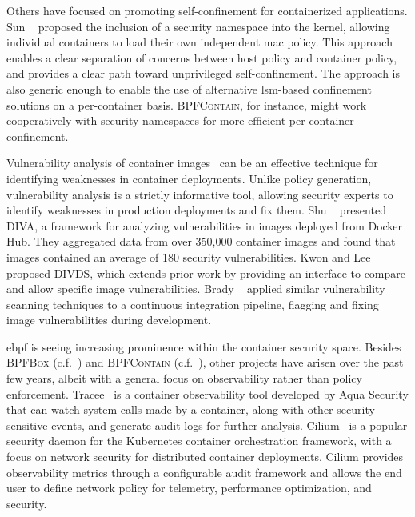 \documentclass[
  fontsize=12pt,
  titlepage=firstiscover,
  paper=letter,
oneside,
  cleardoublepage=plain,
  parskip=half-,
  DIV=10,
  parindent,
  appendixprefix,
  chapterprefix,
  listof=totoc,
]{scrbook}
\newcommand{\bpfbox}{\textsc{BPFBox}}
\newcommand{\bpfcontain}{\textsc{BPFContain}}
\begin{document}
Others have focused on promoting self-confinement for containerized applications. Sun
\etal~\cite{sun2018_security_namespace} proposed the inclusion of a security namespace
into the kernel, allowing individual containers to load their own independent \gls{mac}
policy. This approach enables a clear separation of concerns between host policy and
container policy, and provides a clear path toward unprivileged self-confinement. The
approach is also generic enough to enable the use of alternative \gls{lsm}-based
confinement solutions on a per-container basis. \bpfcontain{}, for instance, might work
cooperatively with security namespaces for more efficient per-container confinement.

Vulnerability analysis of container images~\cite{shu2017_image_vuln, kwon2020_divds,
brady2020_docker_cloud} can be an effective technique for identifying weaknesses in
container deployments. Unlike policy generation, vulnerability analysis is a strictly
informative tool, allowing security experts to identify weaknesses in production
deployments and fix them. Shu \etal~\cite{shu2017_image_vuln} presented DIVA, a framework
for analyzing vulnerabilities in images deployed from Docker Hub. They aggregated data
from over 350,000 container images and found that images contained an average of 180
security vulnerabilities. Kwon and Lee~\cite{kwon2020_divds} proposed DIVDS, which
extends prior work by providing an interface to compare and allow specific image
vulnerabilities.  Brady \etal~\cite{brady2020_docker_cloud} applied similar vulnerability
scanning techniques to a continuous integration pipeline, flagging and fixing image
vulnerabilities during development.

\gls{ebpf} is seeing increasing prominence within the container security space. Besides
\bpfbox{} (c.f.\ ) and \bpfcontain{} (c.f.\ ), other
projects have arisen over the past few years, albeit with a general focus on observability
rather than policy enforcement. Tracee~\cite{tracee} is a container observability tool
developed by Aqua Security that can watch system calls made by a container, along with
other security-sensitive events, and generate audit logs for further analysis.
Cilium~\cite{cilium} is a popular security daemon for the Kubernetes container
orchestration framework, with a focus on network security for distributed container
deployments. Cilium provides observability metrics through a configurable audit framework
and allows the end user to define network policy for telemetry, performance optimization,
and security.
\end{document}
